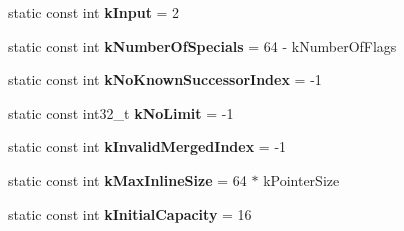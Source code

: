 \begin{DoxyCompactItemize}
\item 
\hypertarget{classv8_1_1internal_1_1_v8___f_i_n_a_l_a71c1361fd16f2a4137e2b1e45aebbc0f}{}static const int {\bfseries k\+Input} = 2\label{classv8_1_1internal_1_1_v8___f_i_n_a_l_a71c1361fd16f2a4137e2b1e45aebbc0f}

\item 
\hypertarget{classv8_1_1internal_1_1_v8___f_i_n_a_l_a948c1d257d2f42330bc2407ee645a315}{}static const int {\bfseries k\+Number\+Of\+Specials} = 64 -\/ k\+Number\+Of\+Flags\label{classv8_1_1internal_1_1_v8___f_i_n_a_l_a948c1d257d2f42330bc2407ee645a315}

\item 
\hypertarget{classv8_1_1internal_1_1_v8___f_i_n_a_l_a2b353b3fbdd76dd17913cbee0ad8ddec}{}static const int {\bfseries k\+No\+Known\+Successor\+Index} = -\/1\label{classv8_1_1internal_1_1_v8___f_i_n_a_l_a2b353b3fbdd76dd17913cbee0ad8ddec}

\item 
\hypertarget{classv8_1_1internal_1_1_v8___f_i_n_a_l_a030568598cdb928d76d7c3c5c4081594}{}static const int32\+\_\+t {\bfseries k\+No\+Limit} = -\/1\label{classv8_1_1internal_1_1_v8___f_i_n_a_l_a030568598cdb928d76d7c3c5c4081594}

\item 
\hypertarget{classv8_1_1internal_1_1_v8___f_i_n_a_l_ac0400f0a9e299929e4664407b523b102}{}static const int {\bfseries k\+Invalid\+Merged\+Index} = -\/1\label{classv8_1_1internal_1_1_v8___f_i_n_a_l_ac0400f0a9e299929e4664407b523b102}

\item 
\hypertarget{classv8_1_1internal_1_1_v8___f_i_n_a_l_a80041a612c27813d8b08dd5817dc9102}{}static const int {\bfseries k\+Max\+Inline\+Size} = 64 $\ast$ k\+Pointer\+Size\label{classv8_1_1internal_1_1_v8___f_i_n_a_l_a80041a612c27813d8b08dd5817dc9102}

\item 
\hypertarget{classv8_1_1internal_1_1_v8___f_i_n_a_l_a149cd0f7ece3d1da2e66857e7ee08fe7}{}static const int {\bfseries k\+Initial\+Capacity} = 16\label{classv8_1_1internal_1_1_v8___f_i_n_a_l_a149cd0f7ece3d1da2e66857e7ee08fe7}

\end{DoxyCompactItemize}
